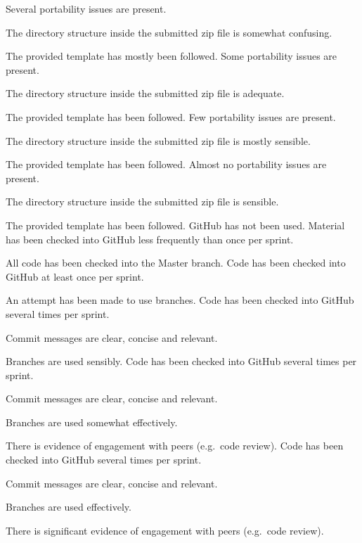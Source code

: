 \documentclass{../fal_assignment}
\begin{document}
\begin{markingrubric}
        \grade Several portability issues are present.
            \par The directory structure inside the submitted zip file is somewhat confusing.
            \par The provided template has mostly been followed.
        \grade Some portability issues are present.
            \par The directory structure inside the submitted zip file is adequate.
            \par The provided template has been followed.
        \grade Few portability issues are present.
            \par The directory structure inside the submitted zip file is mostly sensible.
            \par The provided template has been followed.
        \grade Almost no portability issues are present.
            \par The directory structure inside the submitted zip file is sensible.
            \par The provided template has been followed.
%
        \grade\fail GitHub has not been used.
        \grade Material has been checked into GitHub less frequently than once per sprint.
            \par All code has been checked into the Master branch.
        \grade Code has been checked into GitHub at least once per sprint.
            \par An attempt has been made to use branches.
        \grade Code has been checked into GitHub several times per sprint.
            \par Commit messages are clear, concise and relevant.
            \par Branches are used sensibly.
        \grade Code has been checked into GitHub several times per sprint.
            \par Commit messages are clear, concise and relevant.
            \par Branches are used somewhat effectively.
            \par There is evidence of engagement with peers (e.g.\ code review).
        \grade Code has been checked into GitHub several times per sprint.
            \par Commit messages are clear, concise and relevant.
            \par Branches are used effectively.
            \par There is significant evidence of engagement with peers (e.g.\ code review).
\end{markingrubric}
\end{document}
